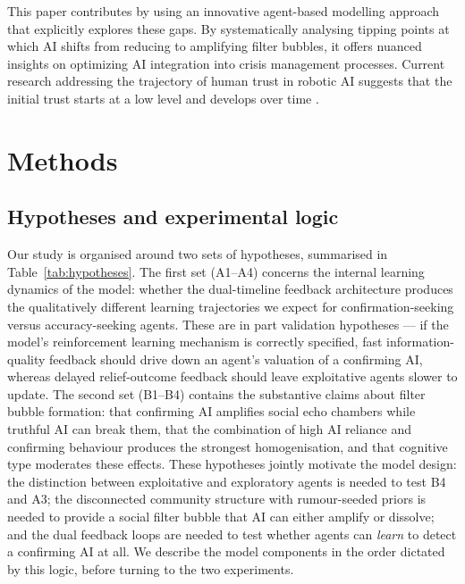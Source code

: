\documentclass[pdflatex,sn-apa]{sn-jnl}%
\begin{document}
This paper contributes by using an innovative agent-based modelling approach that explicitly explores these gaps. By systematically analysing tipping points at which AI shifts from reducing to amplifying filter bubbles, it offers nuanced insights on optimizing AI integration into crisis management processes.
Current research addressing the trajectory of human trust in robotic AI suggests that the 
initial trust starts at a low level and develops over time \citep{glikson2020human}.

\section*{Methods}
\label{sec:methods}

\subsection*{Hypotheses and experimental logic}

Our study is organised around two sets of hypotheses, summarised
in Table~\ref{tab:hypotheses}.
The first set (A1--A4) concerns the internal learning dynamics
of the model: whether the dual-timeline feedback architecture
produces the qualitatively different learning trajectories we
expect for confirmation-seeking versus accuracy-seeking agents.
These are in part validation hypotheses --- if the model's
reinforcement learning mechanism is correctly specified, fast
information-quality feedback should drive down an agent's
valuation of a confirming AI, whereas delayed relief-outcome
feedback should leave exploitative agents slower to update.
The second set (B1--B4) contains the substantive claims about
filter bubble formation: that confirming AI amplifies social
echo chambers while truthful AI can break them, that the
combination of high AI reliance and confirming behaviour produces
the strongest homogenisation, and that cognitive type moderates
these effects.
These hypotheses jointly motivate the model design: the
distinction between exploitative and exploratory agents is needed
to test B4 and A3; the disconnected community structure with
rumour-seeded priors is needed to provide a social filter bubble
that AI can either amplify or dissolve; and the dual feedback
loops are needed to test whether agents can \emph{learn} to
detect a confirming AI at all.
We describe the model components in the order dictated by this
logic, before turning to the two experiments.
\end{document}
